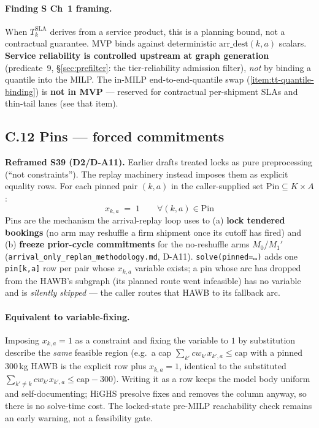 \documentclass[11pt,a4paper]{article}
\theoremstyle{definition}
\begin{document}
\paragraph{Finding S Ch~1 framing.}
When $T_k^{\text{SLA}}$ derives from a service product, this is a planning
bound, not a contractual guarantee. MVP binds against deterministic
$\text{arr\_dest}(k, a)$ scalars. \textbf{Service reliability is controlled
upstream at graph generation} (predicate~9, \S\ref{sec:prefilter}: the
tier-reliability admission filter), \emph{not} by binding a quantile into the
MILP. The in-MILP end-to-end-quantile swap (\ref{item:tt-quantile-binding}) is
\textbf{not in MVP} --- reserved for contractual per-shipment SLAs and thin-tail
lanes (see that item).

\subsection*{C.12 Pins --- forced commitments }

\textbf{Reframed S39 (D2/D-A11).} Earlier drafts treated locks as pure preprocessing
(``not constraints''). The replay machinery instead imposes them as explicit equality rows.
For each pinned pair $(k, a)$ in the caller-supplied set $\text{Pin} \subseteq K \times A$:
\begin{equation}
  x_{k,a} \;=\; 1 \qquad \forall (k, a) \in \text{Pin}
  \tag{C.12} \label{eq:C12-pin}
\end{equation}
Pins are the mechanism the arrival-replay loop uses to (a) \textbf{lock tendered bookings} (no
arm may reshuffle a firm shipment once its cutoff has fired) and (b) \textbf{freeze prior-cycle
commitments} for the no-reshuffle arms $M_0$/$M_1'$ (\texttt{arrival\_only\_replan\_methodology.md},
D-A11). \texttt{solve(pinned=\ldots)} adds one \texttt{pin[k,a]} row per pair whose $x_{k,a}$
variable exists; a pin whose arc has dropped from the HAWB's subgraph (its planned route went
infeasible) has no variable and is \emph{silently skipped} --- the caller routes that HAWB to its
fallback arc.

\paragraph{Equivalent to variable-fixing.} Imposing $x_{k,a}=1$ as a constraint and fixing the
variable to $1$ by substitution describe the \emph{same} feasible region (e.g.\ a cap
$\sum_{k'} cw_{k'} x_{k',a} \le \text{cap}$ with a pinned 300\,kg HAWB is the explicit row plus
$x_{k,a}=1$, identical to the substituted $\sum_{k'\ne k} cw_{k'} x_{k',a} \le \text{cap}-300$).
Writing it as a row keeps the model body uniform and self-documenting; HiGHS presolve fixes and
removes the column anyway, so there is no solve-time cost. The locked-state pre-MILP reachability
check remains an early warning, not a feasibility gate.
\end{document}
